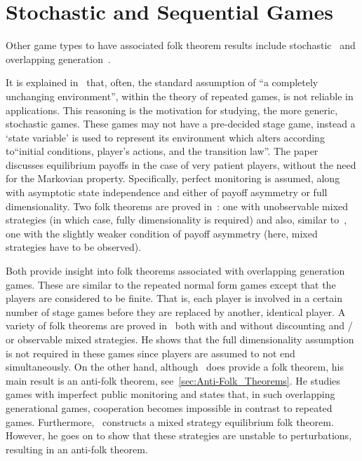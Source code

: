 \section{Stochastic and Sequential Games}\label{sec:Stochastic_and_Sequential_Games}
Other game types to have associated folk theorem results include
stochastic~\cite{Dutta1995} and overlapping generation~\cite{Bhaskar1998,
Gossner1996}.

It is explained in~\cite{Dutta1995} that, often, the standard assumption of ``a
completely unchanging environment'', within the theory of repeated games, is not
reliable in applications. This reasoning is the motivation for studying, the
more generic, stochastic games. These games may not have a pre-decided stage
game, instead a `state variable' is used to represent its environment which
alters according to``initial conditions, player's actions, and the transition
law''. The paper~\cite{Dutta1995} discusses equilibrium payoffs in the case of
very patient players, without the
need for the Markovian property. Specifically, perfect monitoring is assumed,
along with asymptotic state independence and either of payoff asymmetry or full
dimensionality. Two folk theorems are proved in~\cite{Dutta1995}: one with
unobservable mixed strategies (in which case, fully dimensionality is required)
and also, similar to~\cite{Abreu1994}, one with the slightly weaker condition of
payoff asymmetry (here, mixed strategies have to be observed).

Both\cite{Bhaskar1998, Gossner1996} provide insight into folk theorems
associated with overlapping generation games. These are similar to the repeated
normal form games except that the players are considered to be finite.
That is, each player is involved in a certain number of stage games before they
are replaced by another, identical player. A variety
of folk theorems are proved in~\cite{Gossner1996} both with and without
discounting and / or observable mixed strategies. He shows that the full
dimensionality assumption is not required in
these games since players are assumed to not end simultaneously. On the other
hand, although~\cite{Bhaskar1998} does provide a folk theorem, his main result
is an anti-folk theorem, see~\autoref{sec:Anti-Folk_Theorems}. He studies games
with imperfect public monitoring and states that, in such overlapping
generational games, cooperation becomes impossible in contrast to repeated
games. Furthermore,~\cite{Bhaskar1998} constructs a mixed strategy equilibrium
folk theorem. However, he goes on to show that these strategies are unstable to
perturbations, resulting in an anti-folk theorem.

